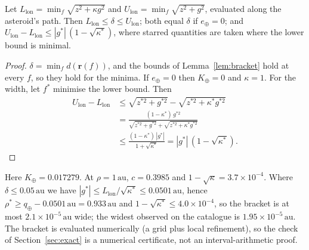 \documentclass[make,article,submit,moreauthors]{Definitions/mdpi}
\newcommand{\au}{\,\mathrm{au}}
\begin{document}
\begin{Corollary}\label{cor:bracket}
Let $L_{\mathrm{lon}} = \min_f\sqrt{z^2 + \kappa g^2}$ and $U_{\mathrm{lon}} = \min_f\sqrt{z^2 + g^2}$, evaluated along the asteroid's path. Then $L_{\mathrm{lon}} \le \delta \le U_{\mathrm{lon}}$; both equal $\delta$ if $e_\oplus = 0$; and $U_{\mathrm{lon}} - L_{\mathrm{lon}} \le |g^*|\,(1 - \sqrt{\kappa^*})$, where starred quantities are taken where the lower bound is minimal.
\end{Corollary}
\begin{proof}
$\delta = \min_f d(\mathbf{r}(f))$, and the bounds of Lemma~\ref{lem:bracket} hold at every $f$, so they hold for the minima. If $e_\oplus = 0$ then $K_\oplus = 0$ and $\kappa = 1$. For the width, let $f^*$ minimise the lower bound. Then
\begin{align*}
U_{\mathrm{lon}} - L_{\mathrm{lon}} &\le \sqrt{z^{*2} + g^{*2}} - \sqrt{z^{*2} + \kappa^* g^{*2}} \\
&= \frac{(1 - \kappa^*)\,g^{*2}}{\sqrt{z^{*2} + g^{*2}} + \sqrt{z^{*2} + \kappa^* g^{*2}}} \\
&\le \frac{(1 - \kappa^*)\,|g^*|}{1 + \sqrt{\kappa^*}} = |g^*|\,(1 - \sqrt{\kappa^*}).
\end{align*}
\end{proof}
Here $K_\oplus = 0.017279$. At $\rho = 1\au$, $c = 0.3985$ and $1 - \sqrt{\kappa} = 3.7\times10^{-4}$. Where $\delta \le 0.05\au$ we have $|g^*| \le L_{\mathrm{lon}}/\sqrt{\kappa^*} \le 0.0501\au$, hence $\rho^* \ge q_\oplus - 0.0501\au = 0.933\au$ and $1 - \sqrt{\kappa^*} \le 4.0\times10^{-4}$, so the bracket is at most $2.1\times10^{-5}\au$ wide; the widest observed on the catalogue is $1.95\times10^{-5}\au$. The bracket is evaluated numerically (a grid plus local refinement), so the check of Section~\ref{sec:exact} is a numerical certificate, not an interval-arithmetic proof.
\end{document}
